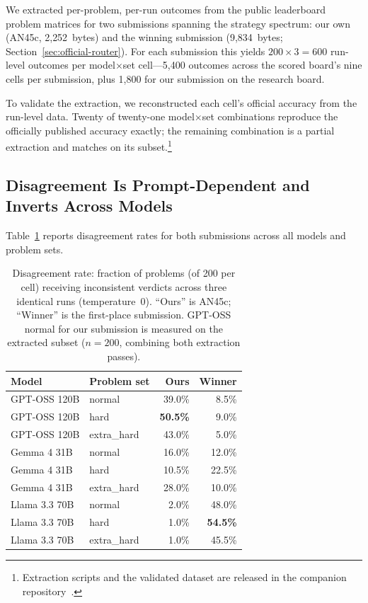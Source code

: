 \documentclass[11pt]{article}
\begin{document}
We extracted per-problem, per-run outcomes from the public leaderboard
problem matrices for two submissions spanning the strategy spectrum:
our own (AN45c, 2{,}252~bytes) and the winning submission
(9{,}834~bytes; Section~\ref{sec:official-router}). For each submission
this yields $200 \times 3 = 600$ run-level outcomes per
model$\times$set cell---5{,}400 outcomes across the scored board's
nine cells per submission, plus 1{,}800 for our submission on the
research board.

To validate the extraction, we reconstructed each cell's official
accuracy from the run-level data. Twenty of twenty-one model$\times$set
combinations reproduce the officially published accuracy exactly; the
remaining combination is a partial extraction and matches on its
subset.\footnote{Extraction scripts and the validated dataset are
released in the companion repository~\citep{cazares2026sair}.}

\subsection{Disagreement Is Prompt-Dependent and Inverts Across Models}
\label{sec:instability-results}

Table~\ref{tab:disagreement} reports disagreement rates for both
submissions across all models and problem sets.

\begin{table}[t]
\centering
\caption{Disagreement rate: fraction of problems (of 200 per cell)
receiving inconsistent verdicts across three identical runs
(temperature~0). ``Ours'' is AN45c; ``Winner'' is the first-place
submission. GPT-OSS normal for our submission is measured on the
extracted subset ($n{=}200$, combining both extraction passes).}
\label{tab:disagreement}
\small
\begin{tabular}{llrr}
\toprule
Model & Problem set & Ours & Winner \\
\midrule
GPT-OSS 120B & normal      & 39.0\% & 8.5\% \\
GPT-OSS 120B & hard        & \textbf{50.5\%} & 9.0\% \\
GPT-OSS 120B & extra\_hard & 43.0\% & 5.0\% \\
\midrule
Gemma 4 31B  & normal      & 16.0\% & 12.0\% \\
Gemma 4 31B  & hard        & 10.5\% & 22.5\% \\
Gemma 4 31B  & extra\_hard & 28.0\% & 10.0\% \\
\midrule
Llama 3.3 70B & normal      & 2.0\% & 48.0\% \\
Llama 3.3 70B & hard        & 1.0\% & \textbf{54.5\%} \\
Llama 3.3 70B & extra\_hard & 1.0\% & 45.5\% \\
\bottomrule
\end{tabular}
\end{table}
\end{document}
